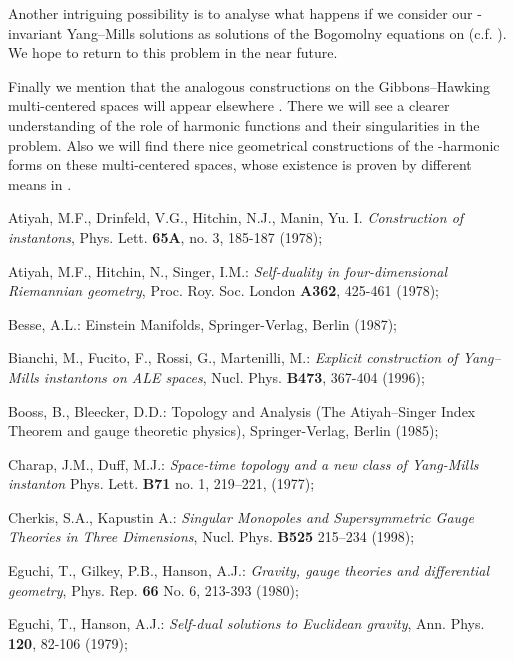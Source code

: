 \documentclass[a4paper,12pt,draft]{article}
\begin{document}
Another intriguing possibility is to analyse what happens if we consider
our \coordHE{}-invariant Yang--Mills solutions as solutions of the Bogomolny
equations on \coordHE{} (c.f. \cite{kro}). We hope to return to
this problem in the near future.

Finally we mention that the analogous constructions on the
Gibbons--Hawking multi-centered spaces will appear elsewhere
\cite{ete-hau3}. There we will see a clearer understanding of the role of
harmonic functions and their singularities in the problem. Also we will
find there nice geometrical constructions of the \coordHE{}-harmonic forms on
these multi-centered spaces, whose existence is proven by different
means in \cite{hau-maz}. 

\begin{thebibliography}{99}

 Atiyah, M.F., Drinfeld, V.G., Hitchin, N.J.,
Manin, Yu. I. {\it Construction of instantons}, Phys. Lett. {\bf 65A},
no. 3, 185-187 (1978);
 
 Atiyah, M.F., Hitchin, N., Singer, I.M.: {\it
Self-duality in four-dimensional Riemannian geometry},
Proc. Roy. Soc. London {\bf A362}, 425-461 (1978);

 Besse, A.L.: Einstein Manifolds, Springer-Verlag, Berlin
(1987);

 Bianchi, M., Fucito, F., Rossi, G., Martenilli,
M.: {\it Explicit construction of Yang--Mills instantons on ALE spaces},
Nucl. Phys. {\bf B473}, 367-404 (1996); 

 Booss, B., Bleecker, D.D.: Topology and
Analysis (The Atiyah--Singer Index Theorem and gauge theoretic physics),
Springer-Verlag, Berlin (1985);

 Charap, J.M., Duff, M.J.: 
{\it Space-time topology and a new class of Yang-Mills instanton} 
Phys. Lett. {\bf B71} no. 1, 219--221, (1977); 

 Cherkis, S.A., Kapustin A.: {\it 
Singular Monopoles and Supersymmetric Gauge Theories in Three Dimensions},
Nucl. Phys. {\bf B525} 215--234 (1998); 

 Eguchi, T., Gilkey, P.B., Hanson, A.J.: {\it 
Gravity, gauge theories and differential geometry}, Phys. Rep. {\bf 66}
No. 6, 213-393 (1980);

 Eguchi, T., Hanson, A.J.:  {\it Self-dual solutions to
Euclidean gravity}, Ann. Phys. {\bf 120}, 82-106 (1979);


\end{thebibliography}
\end{document}
